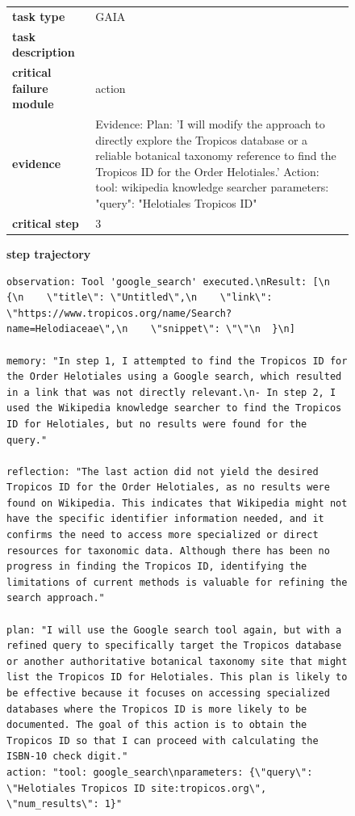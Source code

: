 \documentclass[../../main.tex]{subfiles}
\begin{document}
\begin{figure}[htbp]
\centering

\begin{tcolorbox}[
    title=\textbf{Error Type - Misalignment},
    colback=orange!1!white,
    colframe=orange!50!black,
    fonttitle=\bfseries,
    enhanced jigsaw,
    breakable
]
\small

\begin{tabularx}{\linewidth}{@{}lX@{}}
\textbf{task type} & GAIA \\
\textbf{task description} &  \\
\textbf{critical failure module} & action \\
\textbf{evidence} & Evidence: Plan: 'I will modify the approach to directly explore the Tropicos database or a reliable botanical taxonomy reference to find the Tropicos ID for the Order Helotiales.' Action: tool: wikipedia knowledge searcher parameters: {"query": "Helotiales Tropicos ID"} \\
\textbf{critical step} & 3 \\
\end{tabularx}

\medskip
\textbf{step trajectory}

\begin{Verbatim}[breaklines=true, breakanywhere=true]
observation: Tool 'google_search' executed.\nResult: [\n  {\n    \"title\": \"Untitled\",\n    \"link\": \"https://www.tropicos.org/name/Search?name=Helodiaceae\",\n    \"snippet\": \"\"\n  }\n]

memory: "In step 1, I attempted to find the Tropicos ID for the Order Helotiales using a Google search, which resulted in a link that was not directly relevant.\n- In step 2, I used the Wikipedia knowledge searcher to find the Tropicos ID for Helotiales, but no results were found for the query."

reflection: "The last action did not yield the desired Tropicos ID for the Order Helotiales, as no results were found on Wikipedia. This indicates that Wikipedia might not have the specific identifier information needed, and it confirms the need to access more specialized or direct resources for taxonomic data. Although there has been no progress in finding the Tropicos ID, identifying the limitations of current methods is valuable for refining the search approach."

plan: "I will use the Google search tool again, but with a refined query to specifically target the Tropicos database or another authoritative botanical taxonomy site that might list the Tropicos ID for Helotiales. This plan is likely to be effective because it focuses on accessing specialized databases where the Tropicos ID is more likely to be documented. The goal of this action is to obtain the Tropicos ID so that I can proceed with calculating the ISBN-10 check digit."
action: "tool: google_search\nparameters: {\"query\": \"Helotiales Tropicos ID site:tropicos.org\", \"num_results\": 1}"
\end{Verbatim}


\end{tcolorbox}
\end{figure}
\end{document}
